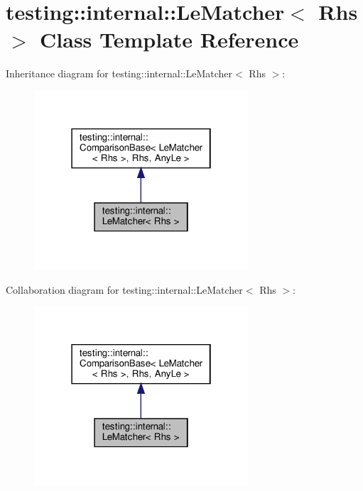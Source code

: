 \hypertarget{classtesting_1_1internal_1_1_le_matcher}{}\section{testing\+:\+:internal\+:\+:Le\+Matcher$<$ Rhs $>$ Class Template Reference}
\label{classtesting_1_1internal_1_1_le_matcher}


Inheritance diagram for testing\+:\+:internal\+:\+:Le\+Matcher$<$ Rhs $>$\+:
\nopagebreak
\begin{figure}[H]
\begin{center}
\leavevmode
\includegraphics[width=226pt]{classtesting_1_1internal_1_1_le_matcher__inherit__graph}
\end{center}
\end{figure}


Collaboration diagram for testing\+:\+:internal\+:\+:Le\+Matcher$<$ Rhs $>$\+:
\nopagebreak
\begin{figure}[H]
\begin{center}
\leavevmode
\includegraphics[width=226pt]{classtesting_1_1internal_1_1_le_matcher__coll__graph}
\end{center}
\end{figure}
